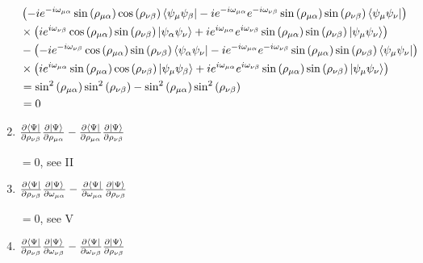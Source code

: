 \documentclass{aux/ttuthes2007}
\newcommand{\bra}[1]{\ensuremath{\left\langle#1\right\vert}}
\newcommand{\ket}[1]{\ensuremath{\left|#1\right\rangle}}
\newcommand{\s}[1]{\sin\left( #1 \right)}
\newcommand{\ssq}[1]{\sin^2\left( #1 \right)}
\newcommand{\co}[1]{\cos\left( #1 \right)}
\newcommand{\kpp}[1]{\frac{\partial \ket\Psi}{\partial #1}}
\newcommand{\bpp}[1]{\frac{\partial \bra\Psi}{\partial #1}}
\newcommand{\ind}[1]{{\uo #1 \oo #1}}
\newcommand{\uo}[1]{
		\IfEqCase{#1}{
			{0}{\mu}
			{1}{\nu}
			{2}{\xi}
		}[\PackageError{uo}{Undefined option to uo: #1}{}]
}
\newcommand{\oo}[1]{
		\IfEqCase{#1}{
			{0}{\alpha}
			{1}{\beta}
			{2}{\gamma}
		}[\PackageError{unocorb}{Undefined option to unuo: #1}{}]
}
\begin{document}
\begin{enumerate}
\begin{align*}
	&\left (
	-i e^{ -i \omega_\ind 0}\s {\rho_\ind 0}\co {\rho_\ind 1}\bra{\psi_{\uo 0} \psi_{\oo 1}} 
	-i e^{ -i \omega_\ind 0}e^{ -i \omega_\ind 1}\s {\rho_\ind 0}\s {\rho_\ind 1}\bra{\psi_{\uo 0} \psi_{\uo 1}} 
	\right )
	\\
	&\times\left (
	ie^{i\omega_\ind 1}\co {\rho_\ind 0 }\s {\rho_\ind 1}\ket {\psi_{\oo 0}\psi_{\uo 1}} 
	+ ie^{i\omega_\ind 0}e^{i\omega_\ind 1}\s {\rho_\ind 0}\s {\rho_\ind 1}\ket{\psi_{\uo 0} \psi_{\uo 1}} 
	\right )
	\\
	&-\left (
	-i e^{ -i \omega_\ind 1}\co {\rho_\ind 0 }\s {\rho_\ind 1}\bra {\psi_{\oo 0}\psi_{\uo 1}}
	-i e^{ -i \omega_\ind 0}e^{ -i \omega_\ind 1}\s {\rho_\ind 0}\s {\rho_\ind 1}\bra{\psi_{\uo 0} \psi_{\uo 1}} 
	\right )
	\\
	&\times\left (
	ie^{i\omega_\ind 0}\s {\rho_\ind 0}\co {\rho_\ind 1}\ket{\psi_{\uo 0} \psi_{\oo 1}} 
	+ ie^{i\omega_\ind 0}e^{i\omega_\ind 1}\s {\rho_\ind 0}\s {\rho_\ind 1}\ket{\psi_{\uo 0} \psi_{\uo 1}} 
	\right )
	\\
	&= \ssq {\rho_\ind 0}\ssq {\rho_\ind 1}
	- \ssq {\rho_\ind 0}\ssq {\rho_\ind 1}
	\\
	&= 0
\end{align*}

	\item $ \bpp{\rho_\ind 1} \kpp{\rho_\ind 0}
	- \bpp{\rho_\ind 0} \kpp{\rho_\ind 1}$

	$=0$, see II

	\item $ \bpp{\rho_\ind 1} \kpp{\omega_\ind 0}
	- \bpp{\omega_\ind 0} \kpp{\rho_\ind 1}$

	$=0$, see V

	\item $ \bpp{\rho_\ind 1} \kpp{\omega_\ind 1}
	- \bpp{\omega_\ind 1} \kpp{\rho_\ind 1}$


\end{enumerate}
\end{document}
